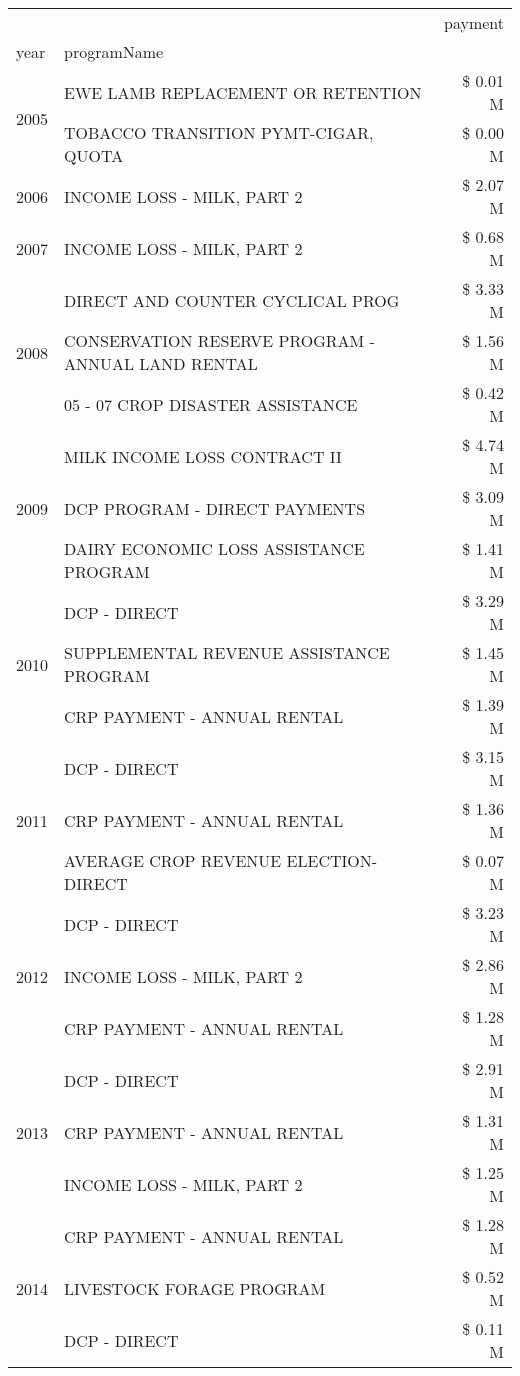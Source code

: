 \begin{tabular}{llr}
\toprule
 &  & payment \\
year & programName &  \\
\midrule
\multirow[t]{2}{*}{2005} & EWE LAMB REPLACEMENT OR RETENTION & \$ 0.01 M \\
 & TOBACCO TRANSITION PYMT-CIGAR, QUOTA & \$ 0.00 M \\
\cline{1-3}
2006 & INCOME LOSS - MILK, PART 2 & \$ 2.07 M \\
\cline{1-3}
2007 & INCOME LOSS - MILK, PART 2 & \$ 0.68 M \\
\cline{1-3}
\multirow[t]{3}{*}{2008} & DIRECT AND COUNTER CYCLICAL PROG & \$ 3.33 M \\
 & CONSERVATION RESERVE PROGRAM - ANNUAL LAND RENTAL & \$ 1.56 M \\
 & 05 - 07 CROP DISASTER ASSISTANCE & \$ 0.42 M \\
\cline{1-3}
\multirow[t]{3}{*}{2009} & MILK INCOME LOSS CONTRACT II & \$ 4.74 M \\
 & DCP PROGRAM - DIRECT PAYMENTS & \$ 3.09 M \\
 & DAIRY ECONOMIC LOSS ASSISTANCE PROGRAM & \$ 1.41 M \\
\cline{1-3}
\multirow[t]{3}{*}{2010} & DCP - DIRECT & \$ 3.29 M \\
 & SUPPLEMENTAL REVENUE ASSISTANCE PROGRAM & \$ 1.45 M \\
 & CRP PAYMENT - ANNUAL RENTAL & \$ 1.39 M \\
\cline{1-3}
\multirow[t]{3}{*}{2011} & DCP - DIRECT & \$ 3.15 M \\
 & CRP PAYMENT - ANNUAL RENTAL & \$ 1.36 M \\
 & AVERAGE CROP REVENUE ELECTION-DIRECT & \$ 0.07 M \\
\cline{1-3}
\multirow[t]{3}{*}{2012} & DCP - DIRECT & \$ 3.23 M \\
 & INCOME LOSS - MILK, PART 2 & \$ 2.86 M \\
 & CRP PAYMENT - ANNUAL RENTAL & \$ 1.28 M \\
\cline{1-3}
\multirow[t]{3}{*}{2013} & DCP - DIRECT & \$ 2.91 M \\
 & CRP PAYMENT - ANNUAL RENTAL & \$ 1.31 M \\
 & INCOME LOSS - MILK, PART 2 & \$ 1.25 M \\
\cline{1-3}
\multirow[t]{3}{*}{2014} & CRP PAYMENT - ANNUAL RENTAL & \$ 1.28 M \\
 & LIVESTOCK FORAGE PROGRAM & \$ 0.52 M \\
 & DCP - DIRECT & \$ 0.11 M \\

\end{tabular}
